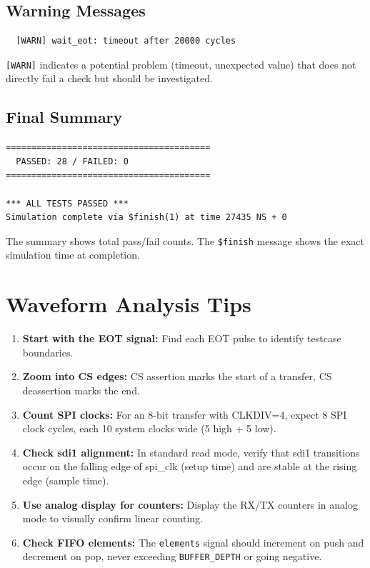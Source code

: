 \subsection{Warning Messages}

\begin{verbatim}
  [WARN] wait_eot: timeout after 20000 cycles
\end{verbatim}
\texttt{[WARN]} indicates a potential problem (timeout, unexpected value) that does not
directly fail a check but should be investigated.

\subsection{Final Summary}

\begin{verbatim}
========================================
  PASSED: 28 / FAILED: 0
========================================

*** ALL TESTS PASSED ***
Simulation complete via $finish(1) at time 27435 NS + 0
\end{verbatim}

The summary shows total pass/fail counts. The \texttt{\$finish} message shows the exact
simulation time at completion.

\section{Waveform Analysis Tips}

\begin{enumerate}[leftmargin=2em]
  \item \textbf{Start with the EOT signal:} Find each EOT pulse to identify testcase boundaries.
  \item \textbf{Zoom into CS edges:} CS assertion marks the start of a transfer, CS deassertion
        marks the end.
  \item \textbf{Count SPI clocks:} For an 8-bit transfer with CLKDIV=4, expect 8 SPI clock cycles,
        each 10 system clocks wide (5 high + 5 low).
  \item \textbf{Check sdi1 alignment:} In standard read mode, verify that sdi1 transitions occur
        on the falling edge of spi\_clk (setup time) and are stable at the rising edge (sample time).
  \item \textbf{Use analog display for counters:} Display the RX/TX counters in analog mode to
        visually confirm linear counting.
  \item \textbf{Check FIFO elements:} The \texttt{elements} signal should increment on push and
        decrement on pop, never exceeding \texttt{BUFFER\_DEPTH} or going negative.
\end{enumerate}
